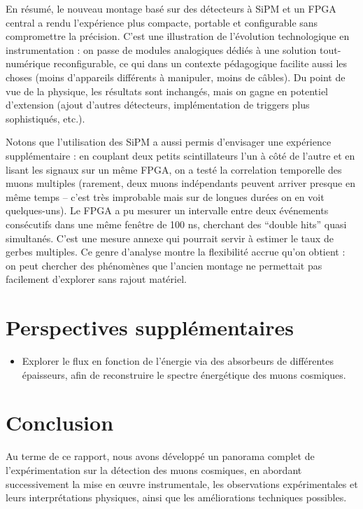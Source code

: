 \documentclass[a4paper,12pt,twoside]{article}
\begin{document}
En résumé, le nouveau montage basé sur des détecteurs à SiPM et un FPGA central a rendu l’expérience plus compacte, portable et configurable sans compromettre la précision. C’est une illustration de l’évolution technologique en instrumentation : on passe de modules analogiques dédiés à une solution tout-numérique reconfigurable, ce qui dans un contexte pédagogique facilite aussi les choses (moins d’appareils différents à manipuler, moins de câbles). Du point de vue de la physique, les résultats sont inchangés, mais on gagne en potentiel d’extension (ajout d’autres détecteurs, implémentation de triggers plus sophistiqués, etc.).

Notons que l’utilisation des SiPM a aussi permis d’envisager une expérience supplémentaire : en couplant deux petits scintillateurs l’un à côté de l’autre et en lisant les signaux sur un même FPGA, on a testé la correlation temporelle des muons multiples (rarement, deux muons indépendants peuvent arriver presque en même temps – c’est très improbable mais sur de longues durées on en voit quelques-uns). Le FPGA a pu mesurer un intervalle entre deux événements consécutifs dans une même fenêtre de 100 ns, cherchant des “double hits” quasi simultanés. C’est une mesure annexe qui pourrait servir à estimer le taux de gerbes multiples. Ce genre d’analyse montre la flexibilité accrue qu’on obtient : on peut chercher des phénomènes que l’ancien montage ne permettait pas facilement d’explorer sans rajout matériel.

\section{Perspectives supplémentaires}
\begin{itemize}
  \item Explorer le flux en fonction de l’énergie via des absorbeurs de différentes épaisseurs, afin de reconstruire le spectre énergétique des muons cosmiques.
\end{itemize}

\section{Conclusion}
Au terme de ce rapport, nous avons développé un panorama complet de l’expérimentation sur la détection des muons cosmiques, en abordant successivement la mise en œuvre instrumentale, les observations expérimentales et leurs interprétations physiques, ainsi que les améliorations techniques possibles.
\end{document}
